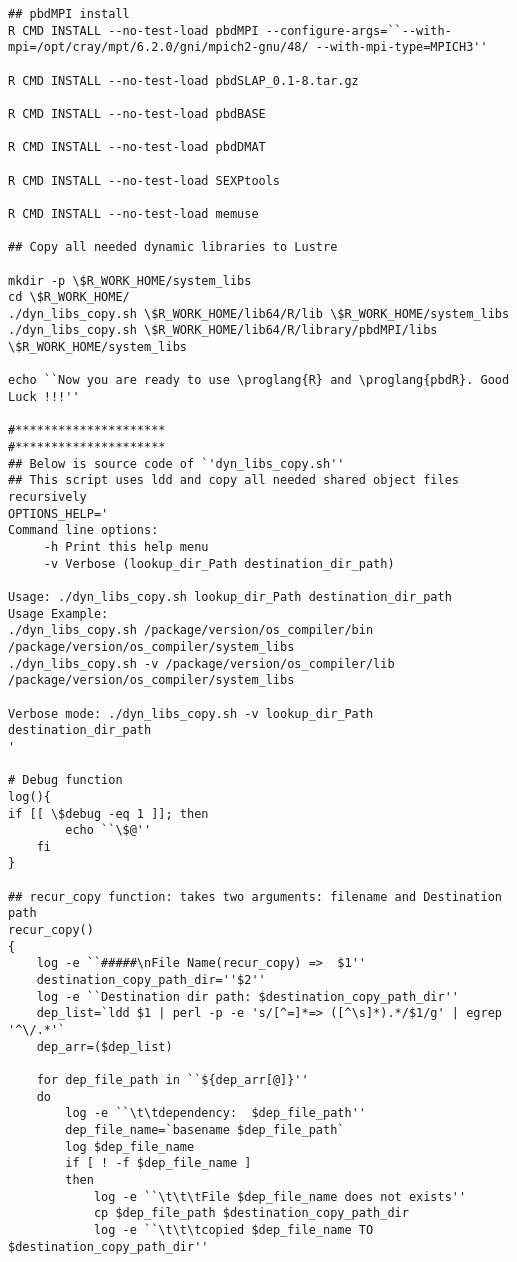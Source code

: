 \begin{lstlisting}[language=bashy]
## pbdMPI install
R CMD INSTALL --no-test-load pbdMPI --configure-args=``--with-mpi=/opt/cray/mpt/6.2.0/gni/mpich2-gnu/48/ --with-mpi-type=MPICH3''

R CMD INSTALL --no-test-load pbdSLAP_0.1-8.tar.gz
 
R CMD INSTALL --no-test-load pbdBASE

R CMD INSTALL --no-test-load pbdDMAT

R CMD INSTALL --no-test-load SEXPtools

R CMD INSTALL --no-test-load memuse

## Copy all needed dynamic libraries to Lustre 

mkdir -p \$R_WORK_HOME/system_libs
cd \$R_WORK_HOME/
./dyn_libs_copy.sh \$R_WORK_HOME/lib64/R/lib \$R_WORK_HOME/system_libs
./dyn_libs_copy.sh \$R_WORK_HOME/lib64/R/library/pbdMPI/libs \$R_WORK_HOME/system_libs

echo ``Now you are ready to use \proglang{R} and \proglang{pbdR}. Good Luck !!!''

#*********************
#*********************
## Below is source code of `'dyn_libs_copy.sh''
## This script uses ldd and copy all needed shared object files recursively
OPTIONS_HELP='
Command line options:
     -h Print this help menu
     -v Verbose (lookup_dir_Path destination_dir_path)

Usage: ./dyn_libs_copy.sh lookup_dir_Path destination_dir_path
Usage Example:
./dyn_libs_copy.sh /package/version/os_compiler/bin /package/version/os_compiler/system_libs
./dyn_libs_copy.sh -v /package/version/os_compiler/lib /package/version/os_compiler/system_libs

Verbose mode: ./dyn_libs_copy.sh -v lookup_dir_Path destination_dir_path
'

# Debug function
log(){
if [[ \$debug -eq 1 ]]; then
        echo ``\$@''
    fi
}

## recur_copy function: takes two arguments: filename and Destination path
recur_copy()
{
    log -e ``#####\nFile Name(recur_copy) =>  $1''
    destination_copy_path_dir=''$2''
    log -e ``Destination dir path: $destination_copy_path_dir''
    dep_list=`ldd $1 | perl -p -e 's/[^=]*=> ([^\s]*).*/$1/g' | egrep '^\/.*'`
    dep_arr=($dep_list)

    for dep_file_path in ``${dep_arr[@]}''
    do
        log -e ``\t\tdependency:  $dep_file_path''
        dep_file_name=`basename $dep_file_path`
        log $dep_file_name
        if [ ! -f $dep_file_name ]
        then
            log -e ``\t\t\tFile $dep_file_name does not exists''
            cp $dep_file_path $destination_copy_path_dir
            log -e ``\t\t\tcopied $dep_file_name TO $destination_copy_path_dir''


\end{lstlisting}
